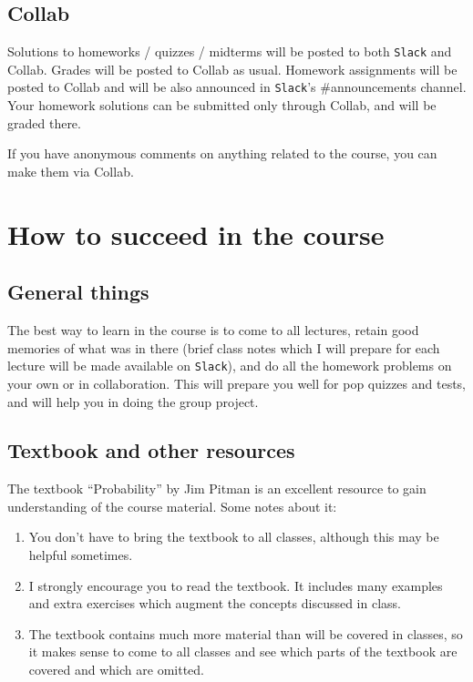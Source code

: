 \documentclass[oneside,11pt]{amsart}
\begin{document}
\subsection{Collab}

Solutions to homeworks / quizzes / midterms will be posted to both
\texttt{Slack} and Collab.  Grades will be posted to Collab as usual.  Homework
assignments will be posted to Collab and will be also announced in
\texttt{Slack}'s \#announcements channel. 
Your homework solutions can be submitted only through Collab, and will be graded there.

If you have anonymous comments on anything related to the course, you can make
them via Collab.

\section{How to succeed in the course}
\label{success}

\subsection{General things}

The best way to learn in the course is to 
come to all lectures, retain good memories 
of what was in there
(brief class notes which I will prepare for each lecture 
will be made available on \texttt{Slack}),
and do all the homework problems on your own or in collaboration.
This will prepare you well for pop quizzes and tests, and will help you in 
doing the group project.

\subsection{Textbook and other resources}





The textbook ``Probability'' by Jim Pitman is an excellent resource 
to gain understanding of the course material. Some notes about it:

\begin{enumerate}[$\bullet$]
	\item You don't have to bring the textbook to all classes, 
		although this may be helpful sometimes. 
	\item I strongly encourage you to read the textbook. It includes many examples and
		extra exercises which augment the concepts discussed in class. 
	\item The textbook contains much more material than will be covered in classes, so it
		makes sense to come to all classes and see which parts of the textbook
		are covered and which are omitted.
\end{enumerate}
\end{document}
